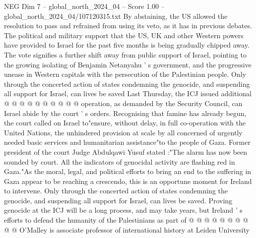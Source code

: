 \begin{textsample}{NEG Dim 7 – global\_north\_2024\_04 – Score 1.00 – global\_north\_2024\_04/107120315.txt}
By abstaining, the US allowed the resolution to pass and refrained from using its veto, as it has in previous debates.
The political and military support that the US, UK and other Western powers have provided to Israel for the past five months is being gradually chipped away.
The vote signifies a further shift away from public support of Israel, pointing to the growing isolating of Benjamin Netanyahu ' s government, and the progressive unease in Western capitals with the persecution of the Palestinian people.
Only through the concerted action of states condemning the genocide, and suspending all support for Israel, can lives be saved Last Thursday, the ICJ issued additional @ @ @ @ @ @ @ @ @ @ operation, as demanded by the Security Council, can Israel abide by the court ' s orders.
Recognising that famine has already begun, the court called on Israel to"ensure, without delay, in full co-operation with the United Nations, the unhindered provision at scale by all concerned of urgently needed basic services and humanitarian assistance"to the people of Gaza.
Former president of the court Judge Abdulqawi Yusuf stated :"The alarm has now been sounded by court.
All the indicators of genocidal activity are flashing red in Gaza."As the moral, legal, and political efforts to bring an end to the suffering in Gaza appear to be reaching a crescendo, this is an opportune moment for Ireland to intervene.
Only through the concerted action of states condemning the genocide, and suspending all support for Israel, can lives be saved.
Proving genocide at the ICJ will be a long process, and may take years, but Ireland ' s efforts to defend the humanity of the Palestinians as part of @ @ @ @ @ @ @ @ @ @ O'Malley is associate professor of international history at Leiden University

\end{textsample}

